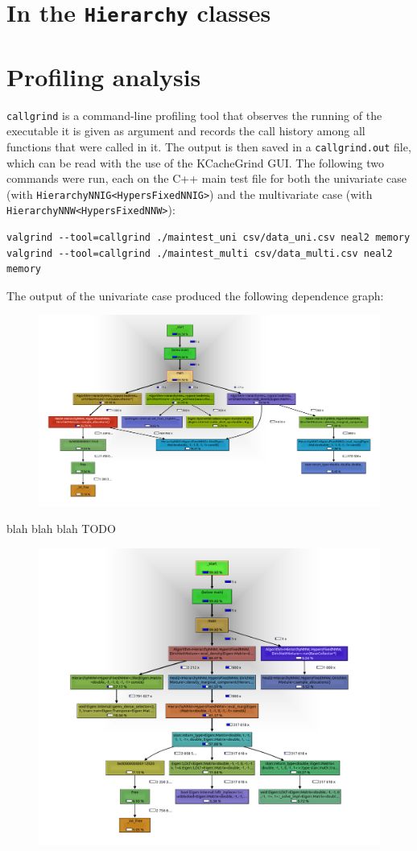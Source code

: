 \section{In the \texttt{Hierarchy} classes}



\section{Profiling analysis}
\verb|callgrind| is a command-line profiling tool that observes the running of the executable it is given as argument and records the call history among all functions that were called in it.
The output is then saved in a \verb|callgrind.out| file, which can be read with the use of the KCacheGrind GUI.
The following two commands were run, each on the C++ main test file for both the univariate case (with \verb|HierarchyNNIG<HypersFixedNNIG>|) and the multivariate case (with \verb|HierarchyNNW<HypersFixedNNW>|):
\begin{verbatim}
valgrind --tool=callgrind ./maintest_uni csv/data_uni.csv neal2 memory
valgrind --tool=callgrind ./maintest_multi csv/data_multi.csv neal2 memory
\end{verbatim}
The output of the univariate case produced the following dependence graph:
\begin{figure}[h]
	\centering
		\includegraphics[scale=0.35]{etc/kcg_uni.png}
\end{figure}
blah blah blah TODO
\begin{figure}[h]
		\includegraphics[scale=0.35]{etc/kcg_multi.png}
\end{figure}
